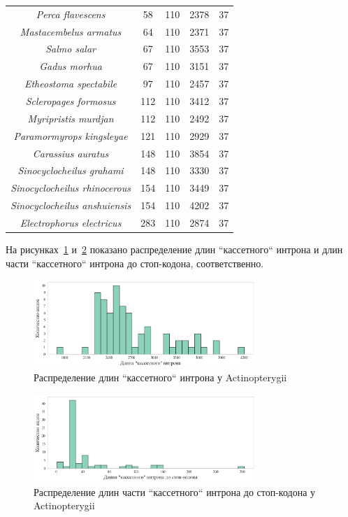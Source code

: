 \begin{longtable}[c]{|c|c|c|c|c|}
\textit{Perca flavescens}              & 58  & 110 & 2378 & 37 \\
\textit{Mastacembelus armatus}         & 64  & 110 & 2371 & 37 \\
\textit{Salmo salar}                   & 67  & 110 & 3553 & 37 \\
\textit{Gadus morhua}                  & 67  & 110 & 3151 & 37 \\
\textit{Etheostoma spectabile}         & 97  & 110 & 2457 & 37 \\
\textit{Scleropages formosus}          & 112 & 110 & 3412 & 37 \\
\textit{Myripristis murdjan}           & 112 & 110 & 2492 & 37 \\
\textit{Paramormyrops kingsleyae}      & 121 & 110 & 2929 & 37 \\
\textit{Carassius auratus}             & 148 & 110 & 3854 & 37 \\
\textit{Sinocyclocheilus grahami}      & 148 & 110 & 3330 & 37 \\
\textit{Sinocyclocheilus rhinocerous}  & 154 & 110 & 3449 & 37 \\
\textit{Sinocyclocheilus anshuiensis}  & 154 & 110 & 4202 & 37 \\
\textit{Electrophorus electricus}      & 283 & 110 & 2874 & 37 \\ \hline
\end{longtable}

На рисунках~\ref{fig:Actinopterygii_intron} и~\ref{fig:Actinopterygii_intron_stop} показано распределение длин ``кассетного`` интрона и длин части ``кассетного`` интрона до стоп-кодона, соответственно.

\begin{figure}[hb] %
    \centering
    \includegraphics[width=0.75\textwidth]{images/Actinopterygii_intron}
    \caption{Распределение длин ``кассетного`` интрона у Actinopterygii}
    \label{fig:Actinopterygii_intron}
\end{figure}

\begin{figure}[ht] %
    \centering
    \includegraphics[width=0.75\textwidth]{images/Actinopterygii_intron_stop}
    \caption{Распределение длин части ``кассетного`` интрона до стоп-кодона у Actinopterygii}
    \label{fig:Actinopterygii_intron_stop}
\end{figure}

